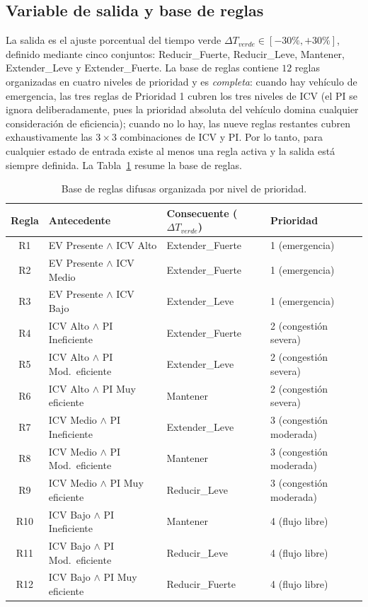 \subsection{Variable de salida y base de reglas}\label{subsec:fuzzy-reglas}

La salida es el ajuste porcentual del tiempo verde $\Delta T_{verde}\in[-30\%,+30\%]$, definido
mediante cinco conjuntos: Reducir\_Fuerte, Reducir\_Leve, Mantener, Extender\_Leve y
Extender\_Fuerte. La base de reglas contiene $12$ reglas organizadas en cuatro niveles de
prioridad y es \emph{completa}: cuando hay vehículo de emergencia, las tres reglas de Prioridad
1 cubren los tres niveles de ICV (el PI se ignora deliberadamente, pues la prioridad absoluta
del vehículo domina cualquier consideración de eficiencia); cuando no lo hay, las nueve reglas
restantes cubren exhaustivamente las $3\times 3$ combinaciones de ICV y PI. Por lo tanto, para
cualquier estado de entrada existe al menos una regla activa y la salida está siempre definida.
La Tabla~\ref{tab:reglas-difusas} resume la base de reglas.

\begin{table}[H]
  \centering
  \footnotesize
  \caption{Base de reglas difusas organizada por nivel de prioridad.}
  \label{tab:reglas-difusas}
  \begin{tabular}{@{}clll@{}}
    \toprule
    \textbf{Regla} & \textbf{Antecedente} & \textbf{Consecuente ($\Delta T_{verde}$)} & \textbf{Prioridad}\\
    \midrule
    R1 & EV Presente $\land$ ICV Alto & Extender\_Fuerte & 1 (emergencia)\\
    R2 & EV Presente $\land$ ICV Medio & Extender\_Fuerte & 1 (emergencia)\\
    R3 & EV Presente $\land$ ICV Bajo & Extender\_Leve & 1 (emergencia)\\
    \midrule
    R4 & ICV Alto $\land$ PI Ineficiente & Extender\_Fuerte & 2 (congestión severa)\\
    R5 & ICV Alto $\land$ PI Mod.\ eficiente & Extender\_Leve & 2 (congestión severa)\\
    R6 & ICV Alto $\land$ PI Muy eficiente & Mantener & 2 (congestión severa)\\
    \midrule
    R7 & ICV Medio $\land$ PI Ineficiente & Extender\_Leve & 3 (congestión moderada)\\
    R8 & ICV Medio $\land$ PI Mod.\ eficiente & Mantener & 3 (congestión moderada)\\
    R9 & ICV Medio $\land$ PI Muy eficiente & Reducir\_Leve & 3 (congestión moderada)\\
    \midrule
    R10 & ICV Bajo $\land$ PI Ineficiente & Mantener & 4 (flujo libre)\\
    R11 & ICV Bajo $\land$ PI Mod.\ eficiente & Reducir\_Leve & 4 (flujo libre)\\
    R12 & ICV Bajo $\land$ PI Muy eficiente & Reducir\_Fuerte & 4 (flujo libre)\\
    \bottomrule
  \end{tabular}
\end{table}

